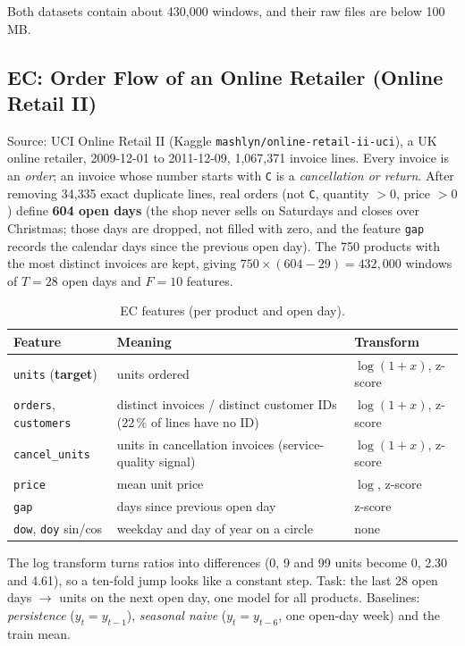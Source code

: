 \documentclass[11pt, a4paper]{article}
\begin{document}
Both datasets contain about 430{,}000 windows, and their raw files are below 100\,MB.

\subsection{EC: Order Flow of an Online Retailer (Online Retail II)}

Source: UCI Online Retail II (Kaggle \texttt{mashlyn/online-retail-ii-uci}), a UK online retailer, 2009-12-01 to 2011-12-09,
1{,}067{,}371 invoice lines. Every invoice is an \emph{order}; an invoice whose number starts with \texttt{C} is a
\emph{cancellation or return}. After removing 34{,}335 exact duplicate lines, real orders (not \texttt{C}, quantity $>0$, price $>0$)
define \textbf{604 open days} (the shop never sells on Saturdays and closes over Christmas; those days are dropped, not filled
with zero, and the feature \texttt{gap} records the calendar days since the previous open day). The 750 products with the most
distinct invoices are kept, giving $750\times(604-29)=432{,}000$ windows of $T=28$ open days and $F=10$ features.

\begin{table}[H]
\centering
\caption{EC features (per product and open day).}
\small
\begin{tabularx}{\textwidth}{lXl}
\toprule
Feature & Meaning & Transform \\
\midrule
\texttt{units} (\textbf{target}) & units ordered & $\log(1+x)$, z-score \\
\texttt{orders}, \texttt{customers} & distinct invoices / distinct customer IDs (22\,\% of lines have no ID) & $\log(1+x)$, z-score \\
\texttt{cancel\_units} & units in cancellation invoices (service-quality signal) & $\log(1+x)$, z-score \\
\texttt{price} & mean unit price & $\log$, z-score \\
\texttt{gap} & days since previous open day & z-score \\
\texttt{dow}, \texttt{doy} sin/cos & weekday and day of year on a circle & none \\
\bottomrule
\end{tabularx}
\end{table}

The log transform turns ratios into differences (0, 9 and 99 units become 0, 2.30 and 4.61), so a ten-fold jump looks like a
constant step. Task: the last 28 open days $\to$ units on the next open day, one model for all products.
Baselines: \emph{persistence} ($y_t=y_{t-1}$), \emph{seasonal naive} ($y_t=y_{t-6}$, one open-day week) and the train mean.
\end{document}

